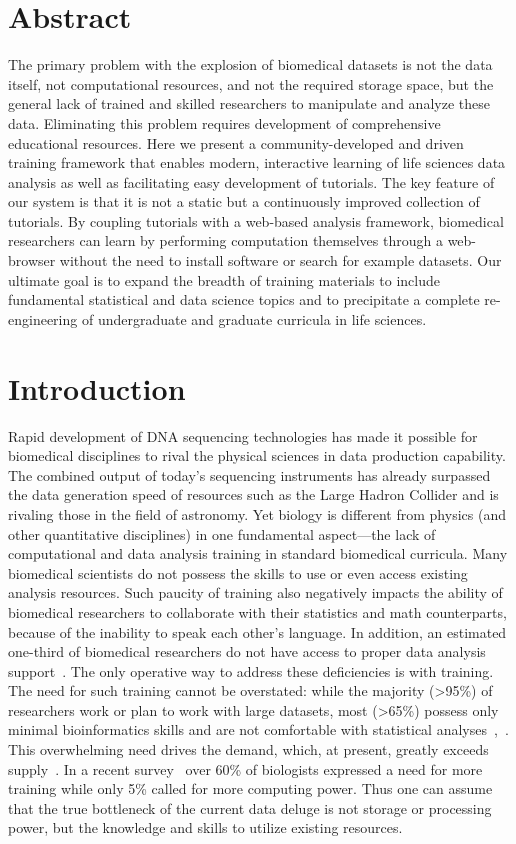 \section*{Abstract}
The primary problem with the explosion of biomedical datasets is not the data itself, not computational resources, and not the required storage space, but the general lack of trained and skilled researchers to manipulate and analyze these data. Eliminating this problem requires development of comprehensive educational resources. Here we present a community-developed and driven training framework that enables modern, interactive learning of life sciences data analysis as well as facilitating easy development of tutorials. The key feature of our system is that it is not a static but a continuously improved collection of tutorials. By coupling tutorials with a web-based analysis framework, biomedical researchers can learn by performing computation themselves through a web-browser without the need to install software or search for example datasets. Our ultimate goal is to expand the breadth of training materials to include fundamental statistical and data science topics and to precipitate a complete re-engineering of undergraduate and graduate curricula in life sciences.

\section*{Introduction}
Rapid development of DNA sequencing technologies has made it possible for biomedical disciplines to rival the physical sciences in data production capability. The combined output of today’s sequencing instruments has already surpassed the data generation speed of resources such as the Large Hadron Collider and is rivaling those in the field of astronomy. Yet biology is different from physics (and other quantitative disciplines) in one fundamental aspect—the lack of computational and data analysis training in standard biomedical curricula. Many biomedical scientists do not possess the skills to use or even access existing analysis resources.
Such paucity of training also negatively impacts the ability of biomedical researchers to collaborate with their statistics and math counterparts, because of the inability to speak each other’s language. In addition, an estimated one-third of biomedical researchers do not have access to proper data analysis support~\cite{larcombe2017elixir}. The only operative way to address these deficiencies is with training. The need for such training cannot be overstated: while the majority (>95\%) of researchers work or plan to work with large datasets, most (>65\%) possess only minimal bioinformatics skills and are not comfortable with statistical analyses~\cite{larcombe2017elixir},~\cite{williams2017vision}.
This overwhelming need drives the demand, which, at present, greatly exceeds supply~\cite{attwood2017global}. In a recent survey~\cite{survey2013embl} over 60\% of biologists expressed a need for more training while only 5\% called for more computing power. Thus one can assume that the true bottleneck of the current data deluge is not storage or processing power, but the knowledge and skills to utilize existing resources.

